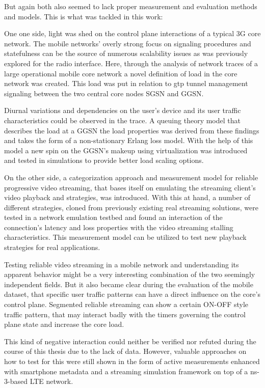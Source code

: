 But again both also seemed to lack proper measurement and evaluation methods and models. This is what was tackled in this work: 

One one side, light was shed on the control plane interactions of a typical \gls{3G} core network. The mobile networks' overly strong focus on signaling procedures and statefulness can be the source of numerous scalability issues as was previously explored for the radio interface. Here, through the analysis of network traces of a large operational mobile core network a novel definition of load in the core network was created. This load was put in relation to \gls{gtp} tunnel management signaling between the two central core nodes \gls{SGSN} and \gls{GGSN}. 

Diurnal variations and dependencies on the user's device and its user traffic characteristics could be observed in the trace. A queuing theory model that describes the load at a \gls{GGSN} the load properties was derived from these findings and takes the form of a non-stationary Erlang loss model. With the help of this model a new spin on the \gls{GGSN}'s makeup using virtualization was introduced and tested in simulations to provide better load scaling options.

On the other side, a categorization approach and measurement model for reliable progressive video streaming, that bases itself on emulating the streaming client's video playback and strategies, was introduced. With this at hand, a number of different strategies, cloned from previously existing real streaming solutions, were tested in a network emulation testbed and found an interaction of the connection's latency and loss properties with the video streaming stalling characteristics. This measurement model can be utilized to test new playback strategies for real applications.

Testing reliable video streaming in a mobile network and understanding its apparent behavior might be a very interesting combination of the two seemingly independent fields. But it also became clear during the evaluation of the mobile dataset, that specific user traffic patterns can have a direct influence on the core's control plane. Segmented reliable streaming can show a certain ON-OFF style traffic pattern, that may interact badly with the timers governing the control plane state and increase the core load.

This kind of negative interaction could neither be verified nor refuted during the course of this thesis due to the lack of data. However, valuable approaches on how to test for this were still shown in the form of active measurements enhanced with smartphone metadata and a streaming simulation framework on top of a ns-3-based \gls{LTE} network.

